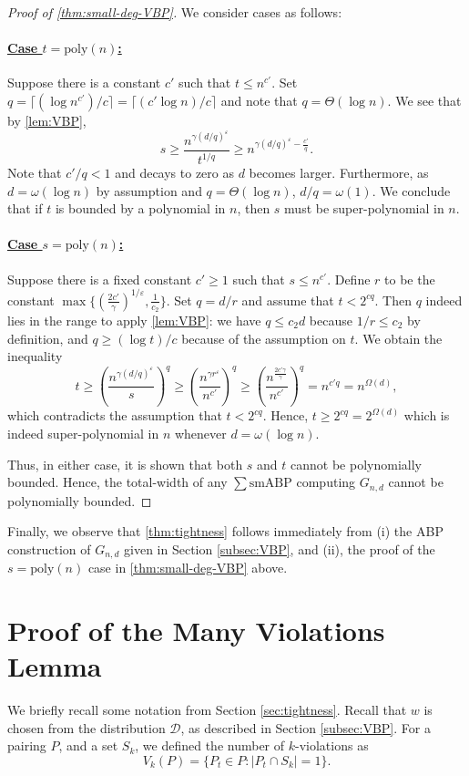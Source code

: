 \documentclass[10pt,a4paper]{article}
\theoremstyle{definition}%
\theoremstyle{plain}
\newcommand{\sbp}{\sum\mathrm{smABP}}
\newcommand{\poly}{\mathrm{poly}}
\newcommand{\eps}{\varepsilon}
\newcommand{\calD}{\mathcal{D}}
\begin{document}
\begin{proof}[Proof of \autoref{thm:small-deg-VBP}]
We consider cases as follows:
\paragraph{\underline{Case $t = \poly(n)$:}} Suppose there is a constant $c'$ such that $t\leq n^{c'}$. Set $q = \lceil(\log n^{c'})/c\rceil = \lceil (c'\log n)/c\rceil$ and note that $q = \Theta(\log n)$. We see that by \autoref{lem:VBP},
\[
s \geq \frac{n^{\gamma{({d/q})^\eps}}}{t^{1/q}}\geq n^{{\gamma (d/q)^\eps}- \frac{c'}{q}}.
\]
Note that $c'/q <1$ and decays to zero as $d$ becomes larger. Furthermore, as $d = \omega(\log n)$ by assumption and $q = \Theta(\log n)$, $d/q = \omega(1)$. We conclude that if $t$ is bounded by a polynomial in $n$, then $s$ must be super-polynomial in $n$.

\paragraph{\underline{Case $s = \poly(n)$:}} Suppose there is a fixed constant $c'\geq 1$ such that $s\leq n^{c'}$. Define $r$ to be the constant $ \max\{(\frac{2c'}{\gamma})^{1/\eps}, \frac{1}{c_2}\}$. Set $q = d/r$ and assume that $t<2^{cq}$. Then $q$ indeed lies in the range to apply \autoref{lem:VBP}: we have $q\leq c_2d$ because $1/r\leq c_2$ by definition, and $q\geq (\log t)/c$ because of the assumption on $t$. We obtain the inequality
\[
t\geq \left(\frac{n^{\gamma ({d/q})^\eps}}{s}\right)^q \geq \left(\frac{n^{{\gamma r^\eps}}}{n^{c'}}\right)^q\geq \left(\frac{n^{\frac{2c'\gamma }{\gamma}}}{n^{c'}}\right)^q = n^{c'q} = n^{\Omega(d)},
\]
which contradicts the assumption that $t<2^{cq}$. Hence, $t \geq 2^{cq} = 2^{\Omega(d)}$ which is indeed super-polynomial in $n$ whenever $d = \omega(\log n)$.

Thus, in either case, it is shown that both $s$ and $t$ cannot be polynomially bounded. Hence, the total-width of any $\sbp$ computing $G_{n,d}$ cannot be polynomially bounded.
\end{proof}

Finally, we observe that \autoref{thm:tightness} follows immediately from (i) the ABP construction of $G_{n,d}$ given in Section \ref{subsec:VBP}, and (ii), the proof of the $s = \poly(n)$ case in \autoref{thm:small-deg-VBP} above.

\appendix
\section{Proof of the Many Violations Lemma}\label{sec:app}
We briefly recall some notation from Section \ref{sec:tightness}. Recall that $w$ is chosen from the distribution $\calD$, as described in Section \ref{subsec:VBP}. For a pairing $P$, and a set $S_k$, we defined the number of $k$-violations as
$$
V_k(P) = \{P_t \in P : |P_t \cap S_k| = 1\}.
$$
\end{document}
